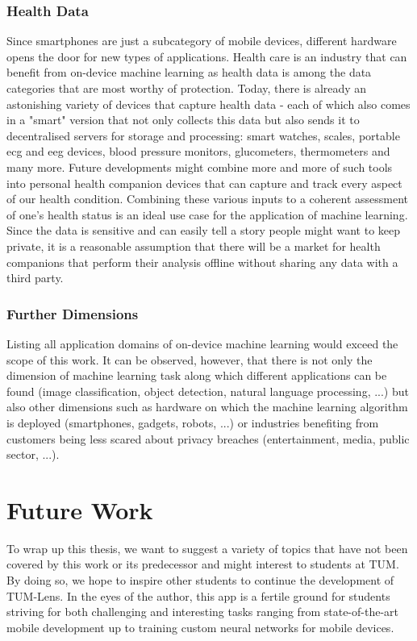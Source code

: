 \documentclass[
			   fontsize=11pt,
               paper=a4,
               bibliography=totoc,
               idxtotoc,
               headsepline,
               footsepline,
               footinclude=false,
               BCOR=12mm,
               DIV=13,
               openany,   %
               ]
               {scrbook}
\begin{document}
\subsubsection{Health Data}
Since smartphones are just a subcategory of mobile devices, different hardware opens the door for new types of applications. Health care is an industry that can benefit from on-device machine learning as health data is among the data categories that are most worthy of protection. Today, there is already an astonishing variety of devices that capture health data - each of which also comes in a "smart" version that not only collects this data but also sends it to decentralised servers for storage and processing: smart watches, scales, portable \gls{ecg} and \gls{eeg} devices, blood pressure monitors, glucometers, thermometers and many more. Future developments might combine more and more of such tools into personal health companion devices that can capture and track every aspect of our health condition. Combining these various inputs to a coherent assessment of one's health status is an ideal use case for the application of machine learning. Since the data is sensitive and can easily tell a story people might want to keep private, it is a reasonable assumption that there will be a market for health companions that perform their analysis offline without sharing any data with a third party.

\subsubsection{Further Dimensions}
Listing all application domains of on-device machine learning would exceed the scope of this work. It can be observed, however, that there is not only the dimension of machine learning task along which different applications can be found (image classification, object detection, natural language processing, ...) but also other dimensions such as hardware on which the machine learning algorithm is deployed (smartphones, gadgets, robots, ...) or industries benefiting from customers being less scared about privacy breaches (entertainment, media, public sector, ...).

\section{Future Work}

To wrap up this thesis, we want to suggest a variety of topics that have not been covered by this work or its predecessor and might interest to students at TUM. By doing so, we hope to inspire other students to continue the development of TUM-Lens. In the eyes of the author, this app is a fertile ground for students striving for both challenging and interesting tasks ranging from state-of-the-art mobile development up to training custom neural networks for mobile devices.
\end{document}
